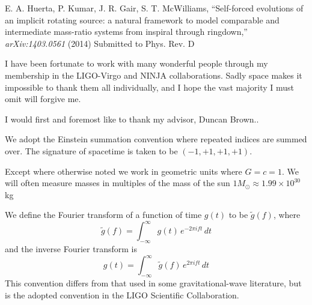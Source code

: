 \documentclass[12pt,notitlepage]{report}
\newcommand{\msun}{M_\odot}
\begin{document}
\noindent E. A. Huerta, P. Kumar, J. R. Gair, S. T. McWilliams, 
``Self-forced evolutions of an implicit rotating source:
a natural framework to model comparable and intermediate mass-ratio 
systems from inspiral through ringdown,''
{\it arXiv:1403.0561} (2014) {\rm Submitted to Phys. Rev. D}

\vspace*{0.5cm}



I have been fortunate to work with many wonderful people through my
membership in the LIGO-Virgo and NINJA collaborations.  Sadly space makes it
impossible to thank them all individually, and I hope the vast
majority I must omit will forgive me.

I would first and foremost like to thank my advisor, Duncan Brown..



We adopt the Einstein summation convention where repeated indices are
summed over.  
%
The signature of spacetime is taken to be $(-1,+1,+1,+1)$.

\noindent Except where otherwise noted we work in geometric units where
$G=c=1$.  We will often measure masses in multiples of the mass of the
sun $1 \msun \approx 1.99 \times 10^{30}$ kg 

\vspace{0.5cm}

\noindent We define the Fourier transform of a function of time $g(t)$ to be
$\tilde{g}(f)$, where
%
\begin{equation*}
\tilde{g}(f)=\int_{-\infty}^\infty g(t)\, e^{- 2 \pi i f t}\, dt
\end{equation*}
%
and the inverse Fourier transform is
%
\begin{equation*}
g(t)=\int_{-\infty}^\infty \tilde{g}(f)\, e^{2 \pi i f t}\, dt
\end{equation*}
%
This convention differs from that used in some gravitational-wave
literature, but is the adopted convention in the LIGO Scientific
Collaboration.
\end{document}
